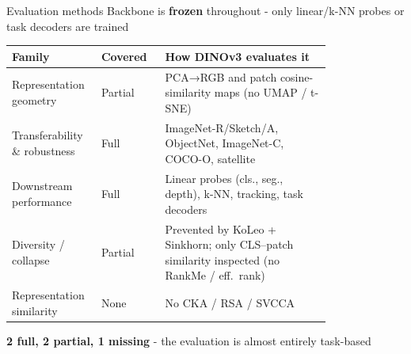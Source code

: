 \documentclass[aspectratio=169,11pt]{beamer}
\begin{document}
\begin{frame}{Evaluation methods}
    Backbone is \textbf{frozen} throughout - only linear/k-NN probes or task decoders are trained
    \vspace{5px}
    \begin{table}
        \centering
        \footnotesize
        \begin{tabular}{>{\raggedright\arraybackslash}p{0.28\linewidth} l >{\raggedright\arraybackslash}p{0.52\linewidth}}
            \toprule[1.5pt]
            \textbf{Family} & \textbf{Covered} & \textbf{How DINOv3 evaluates it} \\
            \midrule[1.5pt]
            Representation geometry & Partial & PCA→RGB and patch cosine-similarity maps (no UMAP / t-SNE) \\
            \midrule
            Transferability \& robustness & Full & ImageNet-R/Sketch/A, ObjectNet, ImageNet-C, COCO-O, satellite \\
            \midrule
            Downstream performance &
            Full & Linear probes (cls., seg., depth), k-NN, tracking, task decoders \\
            \midrule
            Diversity / collapse & Partial & Prevented by KoLeo + Sinkhorn; only CLS--patch similarity inspected (no RankMe / eff.\ rank) \\
            \midrule
            Representation similarity & None & No CKA / RSA / SVCCA \\
            \bottomrule[1.5pt]
        \end{tabular}
    \end{table}
    \vspace{5px}
    \textbf{2 full, 2 partial, 1 missing} - the evaluation is almost entirely task-based
\end{frame}
\end{document}
